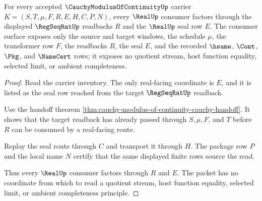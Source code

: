 \begin{theorem}
\label{thm:cauchy-modulus-of-continuity-real-consumer-boundary}
For every accepted $\CauchyModulusOfContinuityUp$ carrier
$K=(S,T,\mu,F,R,E,H,C,P,N)$, every $\RealUp$ consumer factors through the
displayed $\RegSeqRatUp$ readbacks $R$ and the $\RealUp$ seal row $E$. The
consumer surface exposes only the source and target windows, the schedule
$\mu$, the transformer row $F$, the readbacks $R$, the seal $E$, and the
recorded $\hsame$, $\Cont$, $\Pkg$, and $\NameCert$ rows; it exposes no
quotient stream, host function equality, selected limit, or ambient
completeness.
\end{theorem}
\begin{proof}
Read the carrier inventory. The only real-facing coordinate is $E$, and it is
listed as the seal row reached from the target $\RegSeqRatUp$ readback.

Use the handoff theorem
\autoref{thm:cauchy-modulus-of-continuity-cauchy-handoff}. It shows that the
target readback has already passed through $S,\mu,F$, and $T$ before $R$ can
be consumed by a real-facing route.

Replay the seal route through $C$ and transport it through $H$. The package
row $P$ and the local name $N$ certify that the same displayed finite rows
source the read.

Thus every $\RealUp$ consumer factors through $R$ and $E$. The packet has no
coordinate from which to read a quotient stream, host function equality,
selected limit, or ambient completeness principle.
\end{proof}

